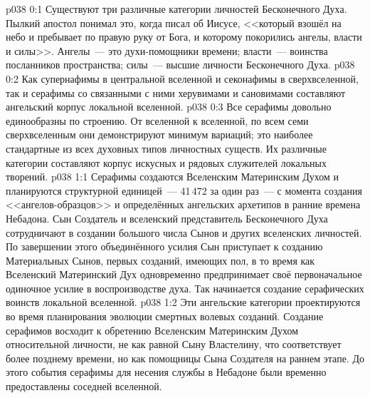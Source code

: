 \author{Мелхиседек}
\vs p038 0:1 Существуют три различные категории личностей Бесконечного Духа. Пылкий апостол понимал это, когда писал об Иисусе, <<который взошёл на небо и пребывает по правую руку от Бога, и которому покорились ангелы, власти и силы>>. Ангелы~--- это духи\hyp{}помощники времени; власти~--- воинства посланников пространства; силы~--- высшие личности Бесконечного Духа.
\vs p038 0:2 \pc Как супернафимы в центральной вселенной и секонафимы в сверхвселенной, так и серафимы со связанными с ними херувимами и сановимами составляют ангельский корпус локальной вселенной.
\vs p038 0:3 Все серафимы довольно единообразны по строению. От вселенной к вселенной, по всем семи сверхвселенным они демонстрируют минимум вариаций; это наиболее стандартные из всех духовных типов личностных существ. Их различные категории составляют корпус искусных и рядовых служителей локальных творений.
\vs p038 1:1 Серафимы создаются Вселенским Материнским Духом и планируются структурной единицей~--- 41\,472 за один раз~--- с момента создания <<ангелов\hyp{}образцов>> и определённых ангельских архетипов в ранние времена Небадона. Сын Создатель и вселенский представитель Бесконечного Духа сотрудничают в создании большого числа Сынов и других вселенских личностей. По завершении этого объединённого усилия Сын приступает к созданию Материальных Сынов, первых созданий, имеющих пол, в то время как Вселенский Материнский Дух одновременно предпринимает своё первоначальное одиночное усилие в воспроизводстве духа. Так начинается создание серафических воинств локальной вселенной.
\vs p038 1:2 Эти ангельские категории проектируются во время планирования эволюции смертных волевых созданий. Создание серафимов восходит к обретению Вселенским Материнским Духом относительной личности, не как равной Сыну Властелину, что соответствует более позднему времени, но как помощницы Сына Создателя на раннем этапе. До этого события серафимы для несения службы в Небадоне были временно предоставлены соседней вселенной.
